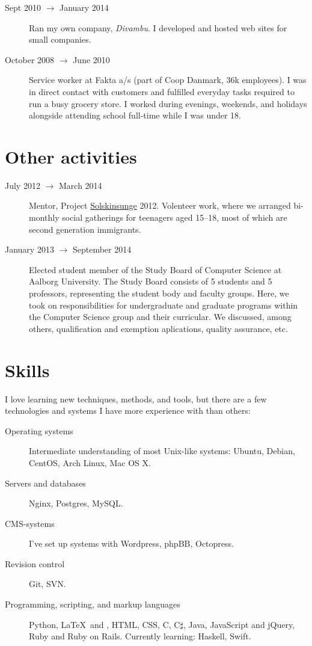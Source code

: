\documentclass[margin,line]{resume}
\begin{document}
\begin{resume}
\begin{description}
  \item[Sept 2010 $\rightarrow$ January 2014] Ran my own company,
  \emph{Divambu}. I developed and hosted web sites for small companies.

  \item[October 2008 $\rightarrow$ June 2010] Service worker at Fakta
  a/s (part of Coop Danmark, 36k employees). I was in direct contact
  with customers and fulfilled everyday tasks required to run a busy
  grocery store. I worked during evenings, weekends, and holidays
  alongside attending school full-time while I was under 18.
\end{description}

\section{\mysidestyle{} Other activities}\vspace{1mm}
\begin{description}
  \item[July 2012 $\rightarrow$ March 2014] Mentor, Project
    \href{http://www.urk.dk/solskinsunge/}{Solskinsunge} 2012. Volenteer
    work, where we arranged bi-monthly social gatherings for teenagers aged
    15--18, most of which are second generation immigrants.

  \item[January 2013 $\rightarrow$ September 2014] Elected student member of the
  Study Board of Computer Science at Aalborg University. The Study Board
  consists of 5 students and 5 professors, representing the student body
  and faculty groups. Here, we took on responsibilities
  for undergraduate and graduate programs within the Computer Science
  group and their curricular. We discussed, among others, qualification
  and exemption aplications, quality assurance, etc.
\end{description}

\section{\mysidestyle{} Skills} \vspace{1mm}
I love learning new techniques, methods, and tools, but there are a few technologies and systems I have more experience with than others:
\vspace{0.5cm}
\begin{description}
  \item[Operating systems] Intermediate understanding of most Unix-like systems: Ubuntu, Debian, CentOS, Arch Linux, Mac OS X.
  \item[Servers and databases] Nginx, Postgres, MySQL\@.
  \item[CMS-systems] I've set up systems with Wordpress, phpBB, Octopress.
  \item[Revision control] Git, SVN\@.
  \item[Programming, scripting, and markup languages] Python, \LaTeX\ and \XeTeX, HTML, CSS, C, C$\sharp$, Java, JavaScript and jQuery, Ruby and Ruby on Rails. Currently learning: Haskell, Swift.
\end{description}


\end{resume}
\end{document}
